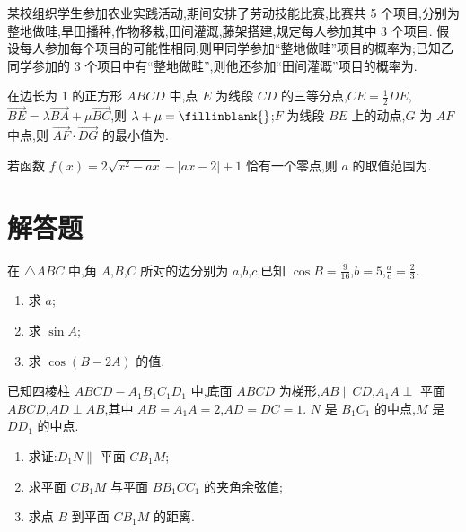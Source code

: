 \begin{problem}
某校组织学生参加农业实践活动,期间安排了劳动技能比赛,比赛共 5 个项目,分别为整地做畦,旱田播种,作物移栽,田间灌溉,藤架搭建,规定每人参加其中 3 个项目. 假设每人参加每个项目的可能性相同,则甲同学参加``整地做畦''项目的概率为\fillinblank{};已知乙同学参加的 3 个项目中有``整地做畦'',则他还参加``田间灌溉''项目的概率为\fillinblank{}.
\end{problem}

\begin{problem}
在边长为 1 的正方形 \(ABCD\) 中,点 \(E\) 为线段 \(CD\) 的三等分点,\(CE=\frac12DE\),\(\overrightarrow{BE}=\lambda\overrightarrow{BA}+\mu\overrightarrow{BC}\),则 \(\lambda+\mu=\fillinblank{}\);\(F\) 为线段 \(BE\) 上的动点,\(G\) 为 \(AF\) 中点,则 \(\overrightarrow{AF}\cdot \overrightarrow{DG}\) 的最小值为\fillinblank{}.

\end{problem}

\begin{problem}
若函数 \(f(x)=2\sqrt{x^2-ax}-|ax-2|+1\) 恰有一个零点,则 \(a\) 的取值范围为\fillinblank{}.
\end{problem}

\section{解答题}

\begin{problem}
在 \(\triangle ABC\) 中,角 \(A\),\(B\),\(C\) 所对的边分别为 \(a\),\(b\),\(c\),已知 \(\cos B=\frac{9}{16}\),\(b=5\),\(\frac{a}{c}=\frac23\).
\begin{enumerate}
    \item 求 \(a\);
    \item 求 \(\sin A\);
    \item 求 \(\cos(B-2A)\) 的值.
\end{enumerate}
\end{problem}

\begin{problem}
已知四棱柱 \(ABCD-A_1B_1C_1D_1\) 中,底面 \(ABCD\) 为梯形,\(AB\parallel CD\),\(A_1A\perp\) 平面 \(ABCD\),\(AD\perp AB\),其中 \(AB=A_1A=2\),\(AD=DC=1\).
\(N\) 是 \(B_1C_1\) 的中点,\(M\) 是 \(DD_1\) 的中点.
\begin{enumerate}
    \item 求证:\(D_1N\parallel\) 平面 \(CB_1M\);
    \item 求平面 \(CB_1M\) 与平面 \(BB_1CC_1\) 的夹角余弦值;
    \item 求点 \(B\) 到平面 \(CB_1M\) 的距离.
\end{enumerate}

\end{problem}

